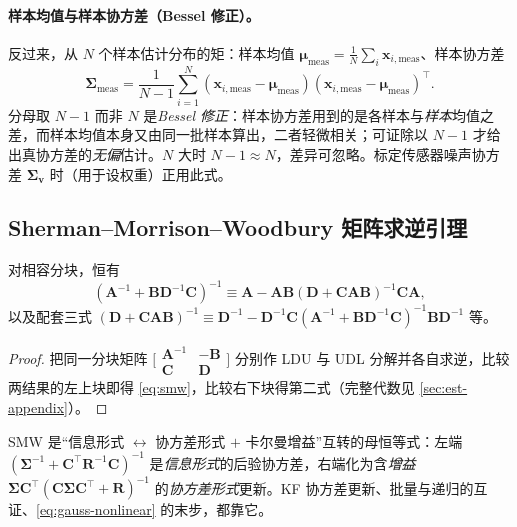 \paragraph{样本均值与样本协方差（Bessel 修正）。}
反过来，从 $N$ 个样本估计分布的矩：样本均值 $\boldsymbol{\mu}_{\text{meas}}=\tfrac1N\sum_i\mathbf{x}_{i,\text{meas}}$、样本协方差
\begin{equation}
  \boldsymbol{\Sigma}_{\text{meas}}=\frac{1}{N-1}\sum_{i=1}^{N}(\mathbf{x}_{i,\text{meas}}-\boldsymbol{\mu}_{\text{meas}})(\mathbf{x}_{i,\text{meas}}-\boldsymbol{\mu}_{\text{meas}})^\top.
  \label{eq:sample-cov}
\end{equation}
分母取 $N-1$ 而非 $N$ 是\emph{Bessel 修正}：样本协方差用到的是各样本与\emph{样本}均值之差，而样本均值本身又由同一批样本算出，二者轻微相关；可证除以 $N-1$ 才给出真协方差的\emph{无偏}估计。$N$ 大时 $N-1\approx N$，差异可忽略。标定传感器噪声协方差 $\boldsymbol{\Sigma}_{\mathbf{v}}$ 时（用于设权重）正用此式。

\subsection{Sherman–Morrison–Woodbury 矩阵求逆引理}
\label{sec:est-smw}

\begin{lemma}\label{lem:smw}
对相容分块，恒有
\begin{equation}
  (\mathbf{A}^{-1}+\mathbf{B}\mathbf{D}^{-1}\mathbf{C})^{-1}\equiv\mathbf{A}-\mathbf{A}\mathbf{B}(\mathbf{D}+\mathbf{C}\mathbf{A}\mathbf{B})^{-1}\mathbf{C}\mathbf{A},
  \label{eq:smw}
\end{equation}
以及配套三式 $(\mathbf{D}+\mathbf{C}\mathbf{A}\mathbf{B})^{-1}\equiv\mathbf{D}^{-1}-\mathbf{D}^{-1}\mathbf{C}(\mathbf{A}^{-1}+\mathbf{B}\mathbf{D}^{-1}\mathbf{C})^{-1}\mathbf{B}\mathbf{D}^{-1}$ 等。
\end{lemma}
\begin{proof}
把同一分块矩阵 $\big[\begin{smallmatrix}\mathbf{A}^{-1}&-\mathbf{B}\\\mathbf{C}&\mathbf{D}\end{smallmatrix}\big]$ 分别作 LDU 与 UDL 分解并各自求逆，比较两结果的左上块即得 \cref{eq:smw}，比较右下块得第二式（完整代数见 \cref{sec:est-appendix}）。
\end{proof}
\noindent SMW 是“信息形式 $\leftrightarrow$ 协方差形式 $+$ 卡尔曼增益”互转的母恒等式：左端 $(\boldsymbol{\Sigma}^{-1}+\mathbf{C}^\top\mathbf{R}^{-1}\mathbf{C})^{-1}$ 是\emph{信息形式}的后验协方差，右端化为含\emph{增益} $\boldsymbol{\Sigma}\mathbf{C}^\top(\mathbf{C}\boldsymbol{\Sigma}\mathbf{C}^\top+\mathbf{R})^{-1}$ 的\emph{协方差形式}更新。KF 协方差更新、批量与递归的互证、\cref{eq:gauss-nonlinear} 的末步，都靠它。

